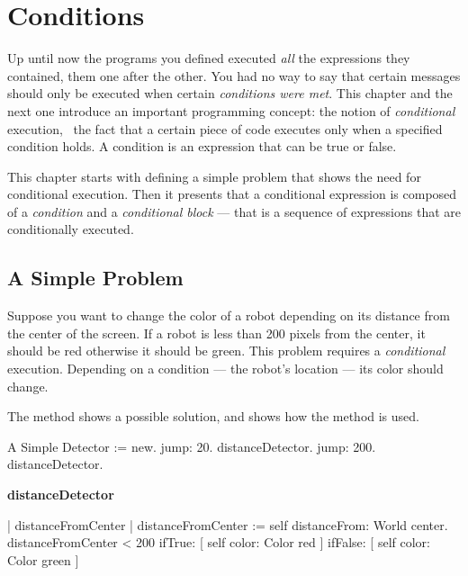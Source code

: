 \ifx\wholebook\relax\else



\fi

\chapter{Conditions}\label{cha:condition}\label{cha:conditional}

Up until now the programs you defined executed \textit{all} the expressions they contained, them one after the other. You had no way to say that certain messages should only be executed when certain \textit{conditions were met}. This chapter and the next one introduce an important programming concept: the notion of \emph{conditional}  execution, \ie\ the fact that a certain piece of code executes only when a specified condition holds. A condition is an expression that can be true or false. 

This chapter starts with defining a simple problem that shows the need for conditional execution.  Then it presents that a conditional expression is composed of a\emph{ condition} and a \emph{conditional block} --- that is a sequence of expressions that are conditionally executed.

\section{A Simple Problem}

Suppose you want to change the color of a robot depending on its distance from the center of the screen. If a robot is less than 200 pixels from the center, it should be red otherwise it should be green. This problem requires a \textit{conditional} execution. Depending on a condition --- the robot's location --- its color should change. 

The method  shows a possible solution, and  shows how the method  is used. 

\begin{scriptwithtitle}{A Simple Detector}\label{scr:detector}
\caro := \Turtle new.
\caro jump: 20.
\caro distanceDetector.
\caro jump: 200.
\caro distanceDetector.
\end{scriptwithtitle}

\begin{method}\label{mth:detector}
\textbf{distanceDetector}

   | distanceFromCenter | 
   distanceFromCenter := self distanceFrom: World center.
   distanceFromCenter < 200
      ifTrue: [ self color: Color red ]
      ifFalse: [ self color: Color green ]
\end{method}

